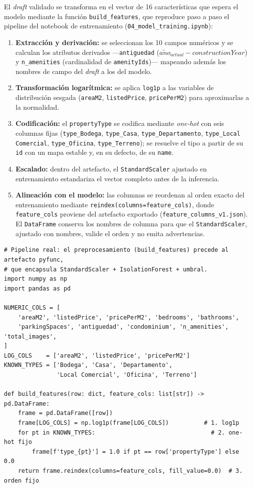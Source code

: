 El \textit{draft} validado se transforma en el vector de 16 características que
espera el modelo mediante la función \texttt{build\_features}, que reproduce
paso a paso el pipeline del notebook de entrenamiento
(\texttt{04\_model\_training.ipynb}):

\begin{enumerate}
  \item \textbf{Extracción y derivación:} se seleccionan los 10 campos numéricos
  y se calculan los atributos derivados ---\texttt{antiguedad}
  ($a\tilde{n}o_{actual} - constructionYear$) y \texttt{n\_amenities}
  (cardinalidad de \texttt{amenityIds})--- mapeando además los nombres de campo
  del \textit{draft} a los del modelo.
  \item \textbf{Transformación logarítmica:} se aplica \texttt{log1p} a las
  variables de distribución sesgada (\texttt{areaM2}, \texttt{listedPrice},
  \texttt{pricePerM2}) para aproximarlas a la normalidad.
  \item \textbf{Codificación:} el \texttt{propertyType} se codifica mediante
  \textit{one-hot} con seis columnas fijas (\texttt{type\_Bodega},
  \texttt{type\_Casa}, \texttt{type\_Departamento},
  \texttt{type\_Local Comercial}, \texttt{type\_Oficina},
  \texttt{type\_Terreno}); se resuelve el tipo a partir de su \texttt{id} con un
  mapa estable y, en su defecto, de su \texttt{name}.
  \item \textbf{Escalado:} dentro del artefacto, el \texttt{StandardScaler}
  ajustado en entrenamiento estandariza el vector completo antes de la inferencia.
  \item \textbf{Alineación con el modelo:} las columnas se reordenan al orden
  exacto del entrenamiento mediante \texttt{reindex(columns=feature\_cols)},
  donde \texttt{feature\_cols} proviene del artefacto exportado
  (\texttt{feature\_columns\_v1.json}). El \texttt{DataFrame} conserva los nombres
  de columna para que el \texttt{StandardScaler}, ajustado con nombres, valide el
  orden y no emita advertencias.
\end{enumerate}

\begin{lstlisting}[style=pythonstyle]
# Pipeline real: el preprocesamiento (build_features) precede al artefacto pyfunc,
# que encapsula StandardScaler + IsolationForest + umbral.
import numpy as np
import pandas as pd

NUMERIC_COLS = [
    'areaM2', 'listedPrice', 'pricePerM2', 'bedrooms', 'bathrooms',
    'parkingSpaces', 'antiguedad', 'condominium', 'n_amenities', 'total_images',
]
LOG_COLS    = ['areaM2', 'listedPrice', 'pricePerM2']
KNOWN_TYPES = ['Bodega', 'Casa', 'Departamento',
               'Local Comercial', 'Oficina', 'Terreno']

def build_features(row: dict, feature_cols: list[str]) -> pd.DataFrame:
    frame = pd.DataFrame([row])
    frame[LOG_COLS] = np.log1p(frame[LOG_COLS])          # 1. log1p
    for pt in KNOWN_TYPES:                                 # 2. one-hot fijo
        frame[f'type_{pt}'] = 1.0 if pt == row['propertyType'] else 0.0
    return frame.reindex(columns=feature_cols, fill_value=0.0)  # 3. orden fijo
\end{lstlisting}

